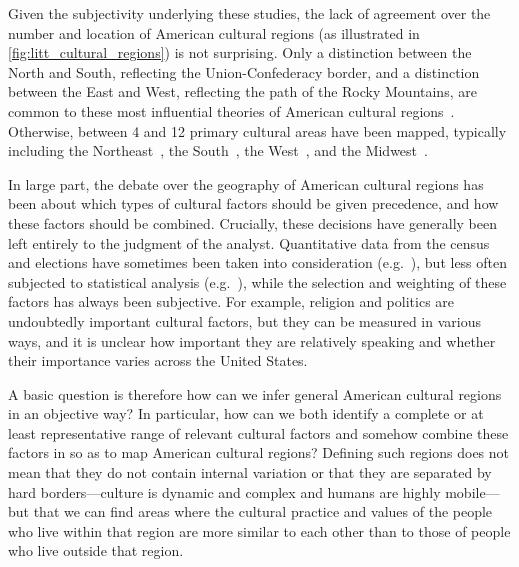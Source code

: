 \documentclass[../thesis.tex]{subfiles}
\begin{document}
Given the subjectivity underlying these studies, the lack of agreement over the number
and location of American cultural regions (as illustrated in
\cref{fig:litt_cultural_regions}) is not surprising. Only a distinction between the
North and South, reflecting the Union-Confederacy border, and a distinction between the
East and West, reflecting the path of the Rocky Mountains, are common to these most
influential theories of American cultural
regions~\cite{OdumSouthernRegions1936,ElazarCitiesPrairie1970,ZelinskyCulturalGeography1992,GastilCulturalRegions1975,GarreauNineNations1996,FischerAlbionSeed1989,LieskeRegionalSubcultures1993,WoodardAmericanNations2012}.
Otherwise, between 4 and 12 primary cultural areas have been mapped, typically including
the
Northeast~\cite{OdumSouthernRegions1936,ElazarCitiesPrairie1970,ZelinskyCulturalGeography1992,GastilCulturalRegions1975,GarreauNineNations1996,FischerAlbionSeed1989,LieskeRegionalSubcultures1993},
the
South~\cite{OdumSouthernRegions1936,ElazarCitiesPrairie1970,ZelinskyCulturalGeography1992,GastilCulturalRegions1975,GarreauNineNations1996,FischerAlbionSeed1989,LieskeRegionalSubcultures1993,WoodardAmericanNations2012},
the
West~\cite{OdumSouthernRegions1936,ElazarCitiesPrairie1970,ZelinskyCulturalGeography1992,GastilCulturalRegions1975,GarreauNineNations1996,WoodardAmericanNations2012},
and the
Midwest~\cite{OdumSouthernRegions1936,ElazarCitiesPrairie1970,ZelinskyCulturalGeography1992,GastilCulturalRegions1975,GarreauNineNations1996}.


In large part, the debate over the geography of American cultural regions has been about
which types of cultural factors should be given precedence, and how these factors should
be combined. Crucially, these decisions have generally been left entirely to the
judgment of the analyst. Quantitative data from the census and elections have sometimes
been taken into consideration
(e.g.~\cite{ZelinskyCulturalGeography1992,GastilCulturalRegions1975,LieskeRegionalSubcultures1993,WoodardAmericanNations2012}),
but less often subjected to statistical analysis
(e.g.~\cite{LieskeRegionalSubcultures1993}), while the selection and weighting of these
factors has always been subjective. For example, religion and politics are undoubtedly
important cultural factors, but they can be measured in various ways, and it is unclear
how important they are relatively speaking and whether their importance varies across
the United States.

A basic question is therefore how can we infer general American cultural regions in an
objective way? In particular, how can we both identify a complete or at least
representative range of relevant cultural factors and somehow combine these factors in
so as to map American cultural regions? Defining such regions does not mean that they do
not contain internal variation or that they are separated by hard borders---culture is
dynamic and complex and humans are highly mobile---but that we can find areas where the
cultural practice and values of the people who live within that region are more similar
to each other than to those of people who live outside that region.
\end{document}
